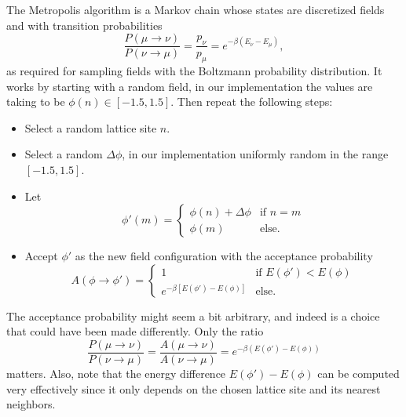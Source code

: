 \documentclass[12pt]{article}
\begin{document}
The Metropolis algorithm is a Markov chain whose states are
discretized fields and with transition probabilities
\begin{equation}
  \frac{P(\mu\to\nu)}{P(\nu\to\mu)}
  = 
  \frac{p_\nu}{p_\mu}
  = 
  e^{-\beta(E_\nu - E_\mu)},
\end{equation}
as required for sampling fields with the Boltzmann probability
distribution. It works by starting with a random field, in our
implementation the values are taking to be $\phi(n) \in [-1.5,
1.5]$. Then repeat the following steps:
\begin{itemize}
\item Select a random lattice site $n$.
\item Select a random $\Delta \phi$, in our implementation uniformly
  random in the range $[-1.5, 1.5]$.
\item Let 
  \begin{equation}
    \phi'(m) =
    \begin{cases}
      \phi(n) + \Delta\phi & \text{if }n = m \\
      \phi(m) & \text{else}.
    \end{cases}
  \end{equation}
\item Accept $\phi'$ as the new field configuration with the
  acceptance probability 
  \begin{equation}
    A(\phi\to\phi') = 
    \begin{cases}
      1 & \text{if } E(\phi') < E(\phi) \\
      e^{-\beta[E(\phi')-E(\phi)]} & \text{else}.
    \end{cases}
  \end{equation}
\end{itemize}
The acceptance probability might seem a bit arbitrary, and indeed is a
choice that could have been made differently. Only the ratio
\begin{equation}
  \frac{P(\mu\to\nu)}{P(\nu\to\mu)}
  = 
  \frac{A(\mu\to\nu)}{A(\nu\to\mu)}
  = 
  e^{-\beta(E(\phi') - E(\phi))}
\end{equation}
matters. Also, note that the energy difference $E(\phi') - E(\phi)$
can be computed very effectively since it only depends on the chosen
lattice site and its nearest neighbors.
\end{document}
